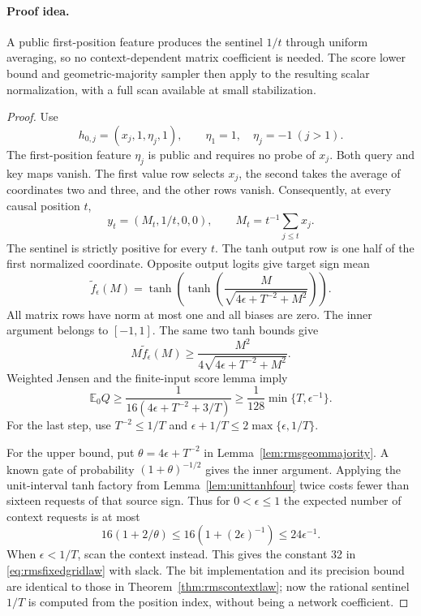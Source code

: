 \paragraph{Proof idea.}
A public first-position feature produces the sentinel $1/t$ through
uniform averaging, so no context-dependent matrix coefficient is needed.
The score lower bound and geometric-majority sampler then apply to the
resulting scalar normalization, with a full scan available at small
stabilization.

\begin{proof}
Use
\[
 h_{0,j}=(x_j,1,\eta_j,1),\qquad
 \eta_1=1,\quad \eta_j=-1\ (j>1).
\]
The first-position feature $\eta_j$ is public and requires no
probe of $x_j$. Both query and key maps vanish. The first
value row selects $x_j$, the second takes the average of
coordinates two and three, and the other rows vanish.
Consequently, at every causal position $t$,
\[
 y_t=(M_t,1/t,0,0),\qquad
 M_t=t^{-1}\sum_{j\le t}x_j.
\]
The sentinel is strictly positive for every $t$. The tanh
output row is one half of the first normalized coordinate.
Opposite output logits give target sign mean
\[
 \widetilde f_\epsilon(M)
 =\tanh\!\left(\tanh\!\left(
 \frac{M}{\sqrt{4\epsilon+T^{-2}+M^2}}
 \right)\right).
\]
All matrix rows have norm at most one and all biases are zero.
The inner argument belongs to $[-1,1]$. The same two tanh
bounds give
\[
 M\widetilde f_\epsilon(M)
 \ge\frac{M^2}{4\sqrt{4\epsilon+T^{-2}+M^2}}.
\]
Weighted Jensen and the finite-input score lemma imply
\[
 \mathbb E_0Q
 \ge\frac1{16(4\epsilon+T^{-2}+3/T)}
 \ge\frac1{128}\min\{T,\epsilon^{-1}\}.
\]
For the last step, use $T^{-2}\le1/T$ and
$\epsilon+1/T\le2\max\{\epsilon,1/T\}$.

For the upper bound, put $\theta=4\epsilon+T^{-2}$ in
Lemma~\ref{lem:rmsgeommajority}. A known gate of probability
$(1+\theta)^{-1/2}$ gives the inner argument. Applying the
unit-interval tanh factory from Lemma~\ref{lem:unittanhfour}
twice costs fewer than sixteen requests of that source sign.
Thus for $0<\epsilon\le1$ the expected number of context
requests is at most
\[
 16(1+2/\theta)
 \le16(1+(2\epsilon)^{-1})
 \le24\epsilon^{-1}.
\]
When $\epsilon<1/T$, scan the context instead. This gives
the constant 32 in \eqref{eq:rmsfixedgridlaw} with slack.
The bit implementation and its precision bound are identical
to those in Theorem~\ref{thm:rmscontextlaw}; now the rational
sentinel $1/T$ is computed from the position index, without
being a network coefficient.
\end{proof}
